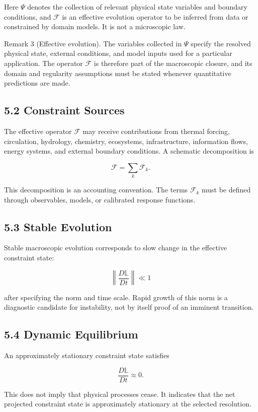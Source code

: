 \documentclass[aps,pre,reprint,superscriptaddress,nofootinbib]{revtex4-2}
\begin{document}
Here \(\Psi\) denotes the collection of relevant physical state variables and boundary conditions, and \(\mathcal{F}\) is an effective evolution operator to be inferred from data or constrained by domain models. It is not a microscopic law.

Remark 3 (Effective evolution). The variables collected in \(\Psi\) specify the resolved physical state, external conditions, and model inputs used for a particular application. The operator \(\mathcal{F}\) is therefore part of the macroscopic closure, and its domain and regularity assumptions must be stated whenever quantitative predictions are made.

\subsection{5.2 Constraint Sources}

The effective operator \(\mathcal{F}\) may receive contributions from thermal forcing, circulation, hydrology, chemistry, ecosystems, infrastructure, information flows, energy systems, and external boundary conditions. A schematic decomposition is

\[ \mathcal{F}=\sum_k \mathcal{F}_k. \]

This decomposition is an accounting convention. The terms \(\mathcal{F}_k\) must be defined through observables, models, or calibrated response functions.

\subsection{5.3 Stable Evolution}

Stable macroscopic evolution corresponds to slow change in the effective constraint state:

\[ \left\|\frac{D\mathbb{L}}{Dt}\right\|\ll 1 \]

after specifying the norm and time scale. Rapid growth of this norm is a diagnostic candidate for instability, not by itself proof of an imminent transition.

\subsection{5.4 Dynamic Equilibrium}

An approximately stationary constraint state satisfies

\[ \frac{D\mathbb{L}}{Dt}\approx 0. \]

This does not imply that physical processes cease. It indicates that the net projected constraint state is approximately stationary at the selected resolution.
\end{document}

